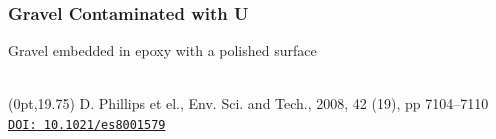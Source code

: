 \documentclass[10pt, xcolor=x11names, compress]{beamer}
\begin{document}
\begin{frame}
  \frametitle{Gravel Contaminated with U}

  \begin{center}
    Gravel embedded in epoxy with a polished surface\\[1ex]

    \\[1ex]

  \end{center}

  \begin{textblock*}{0.5\linewidth}(0pt,19.75\TPVertModule) \tiny
    D. Phillips et el., Env. Sci. and Tech., 2008, 42 (19), pp
    7104–7110
    \href{http://dx.doi.org/10.1021/es8001579}{\color{Blue4}\texttt{DOI:
        10.1021/es8001579}}
  \end{textblock*}
\end{frame}
\end{document}
